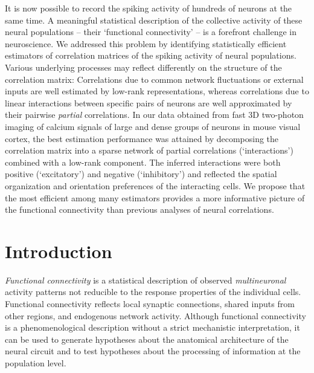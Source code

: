 \documentclass[10pt]{article}
\newcommand{\sq}[1]{\lq#1\rq}
\begin{document}
It is now possible to record the spiking activity of hundreds of neurons at the same time.  A meaningful statistical description of the collective activity of these neural populations -- their \sq{functional connectivity} -- is a forefront challenge in neuroscience.  We addressed this problem by identifying statistically efficient estimators of correlation matrices of the spiking activity of neural populations.  Various underlying processes may reflect differently on the structure of the correlation matrix:  Correlations due to common network fluctuations or external inputs are well estimated by low-rank representations, whereas correlations due to linear interactions between specific pairs of neurons are well approximated by their pairwise \emph{partial} correlations.  In our data obtained from fast 3D two-photon imaging of calcium signals of large and dense groups of neurons in mouse visual cortex, the best estimation performance was attained by decomposing the correlation matrix into a sparse network of partial correlations (\sq{interactions}) combined with a low-rank component. The inferred interactions were both positive (\sq{excitatory}) and negative (\sq{inhibitory}) and reflected the spatial organization and orientation preferences of the interacting cells.  We propose that  the most efficient among many estimators provides a more informative picture of the functional connectivity than previous analyses of neural correlations.

\section*{Introduction}
\emph{Functional connectivity} is a statistical description of observed \emph{multineuronal} activity patterns not reducible to the response properties of the individual cells. Functional connectivity reflects local synaptic connections, shared inputs from other regions, and endogenous network activity. Although functional connectivity is a phenomenological description without a strict mechanistic interpretation, it can be used to generate hypotheses about the anatomical architecture of the neural circuit and to test hypotheses about the processing of information at the population level. 
\end{document}
